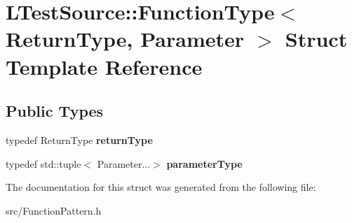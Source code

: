 \hypertarget{struct_l_test_source_1_1_function_type}{\section{L\-Test\-Source\-:\-:Function\-Type$<$ Return\-Type, Parameter $>$ Struct Template Reference}
\label{struct_l_test_source_1_1_function_type}
}
\subsection*{Public Types}
\begin{DoxyCompactItemize}
\item 
\hypertarget{struct_l_test_source_1_1_function_type_a5750c8ee8785ccfceaf4a749bd39265c}{typedef Return\-Type {\bfseries return\-Type}}\label{struct_l_test_source_1_1_function_type_a5750c8ee8785ccfceaf4a749bd39265c}

\item 
\hypertarget{struct_l_test_source_1_1_function_type_a3d4092301cbdd11fb463d7956cd19b56}{typedef std\-::tuple$<$ Parameter...$>$ {\bfseries parameter\-Type}}\label{struct_l_test_source_1_1_function_type_a3d4092301cbdd11fb463d7956cd19b56}

\end{DoxyCompactItemize}


The documentation for this struct was generated from the following file\-:\begin{DoxyCompactItemize}
\item 
src/Function\-Pattern.\-h\end{DoxyCompactItemize}
